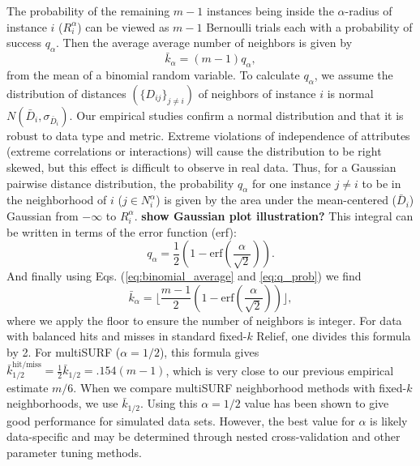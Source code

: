 \documentclass[10pt]{article}
\begin{document}
The probability of the remaining $m-1$ instances being inside the $\alpha$-radius of instance $i$ ($R_i^{\alpha}$) can be viewed as $m-1$ Bernoulli trials each with a probability of success $q_{\alpha}$. Then the average average number of neighbors is given by
\begin{equation}
\label{eq:binomial_average}
  {\bar{k}}_{\alpha} = (m-1)q_{\alpha},
\end{equation}
from the mean of a binomial random variable. To calculate $q_{\alpha}$, we assume the distribution of distances $(\{D_{ij} \}_{j \ne i})$ of neighbors of instance $i$ is normal $N(\bar{D}_i,\sigma_{\bar{D}_i})$. Our empirical studies confirm a normal distribution and that it is robust to data type and metric. Extreme violations of independence of attributes (extreme correlations or interactions) will cause the distribution to be right skewed, but this effect is difficult to observe in real data. Thus, for a Gaussian pairwise distance distribution, the probability $q_{\alpha}$ for one instance $j \ne i$ to be in the neighborhood of $i$ ($j \in N^{\alpha}_{i}$) is given by the area under the mean-centered ($\bar{D}_i$) Gaussian from $-\infty$ to $R_i^{\alpha}$. {\bf show Gaussian plot illustration?} This integral can be written in terms of the error function (erf):
\begin{equation}
\label{eq:q_prob}
q_{\alpha} = \frac{1}{2} \left( 1 - \mathrm{erf}\left( \frac{\alpha}{\sqrt{2}} \right) \right).
\end{equation}
And finally using Eqs. (\ref{eq:binomial_average} and \ref{eq:q_prob}) we find
\begin{equation}\label{eq:kbar}
{\bar{k}}_{\alpha} = \lfloor \frac{m-1}{2}  \left( 1 - \mathrm{erf}\left( \frac{\alpha}{\sqrt{2}} \right) \right) \rfloor,
\end{equation}
where we apply the floor to ensure the number of neighbors is integer. For data with balanced hits and misses in standard fixed-$k$ Relief, one divides this formula by 2. For multiSURF ($\alpha=1/2$), this formula gives $\bar{k}_{1/2}^{\text{hit/miss}} = \frac{1}{2}\bar{k}_{1/2} = .154 (m-1)$, which is very close to our previous empirical estimate $m/6$. When we compare multiSURF neighborhood methods with fixed-$k$ neighborhoods, we use $\bar{k}_{1/2}$. Using this $\alpha=1/2$ value has been shown to give good performance for simulated data sets. However, the best value for $\alpha$ is likely data-specific and may be determined through nested cross-validation and other parameter tuning methods. 
\end{document}
